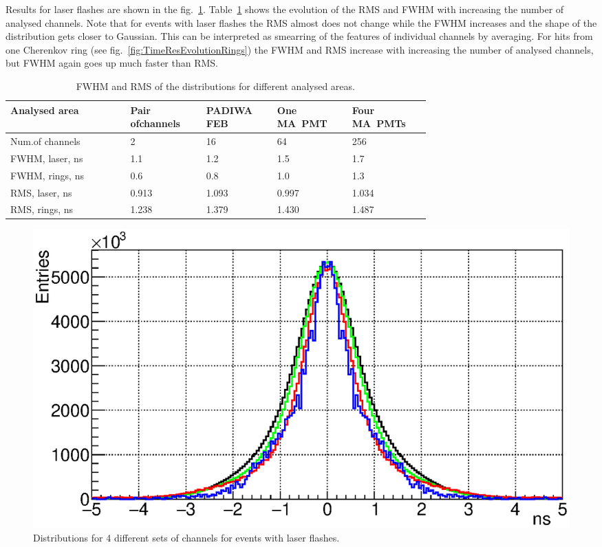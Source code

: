 \documentclass{JACoW-GSI-2015}
\begin{document}
Results for laser flashes are shown in the fig.~\ref{fig:TimeResEvolutionLaser}. Table~\ref{tabl:EvolutionParams} shows the evolution of the RMS and FWHM with increasing the number of analysed channels. Note that for events with laser flashes the RMS almost does not change while the FWHM increases and the shape of the distribution gets closer to Gaussian. This can be interpreted as smearring of the features of individual channels by averaging. For hits from one Cherenkov ring (see fig.~\ref{fig:TimeResEvolutionRings}) the FWHM and RMS increase with increasing the number of analysed channels, but FWHM again goes up much faster than RMS.

\begin{table}[tbh]
\caption{FWHM and RMS of the distributions for different analysed areas.}
\label{tabl:EvolutionParams}
\begin{tabular}{ | p{0.22\linewidth} | p{0.13\linewidth} | p{0.12\linewidth} | p{0.12\linewidth} | p{0.12\linewidth} | }
	\hline
	\scriptsize{Analysed area} & \scriptsize{Pair ofchannels} & \scriptsize{PADIWA FEB} & \scriptsize{One MA~PMT} & \scriptsize{Four MA~PMTs} \\
	\hline
	\scriptsize{Num.of channels} & 2 & 16 & 64 & 256 \\
	\hline
	\scriptsize{FWHM, laser, ns} & 1.1 & 1.2 & 1.5 & 1.7 \\
	\hline
	\scriptsize{FWHM, rings, ns} & 0.6 & 0.8 & 1.0 & 1.3 \\
	\hline
	\scriptsize{RMS, laser, ns} & 0.913 & 1.093 & 0.997 & 1.034 \\
	\hline
	\scriptsize{RMS, rings, ns} & 1.238 & 1.379 & 1.430 & 1.487 \\
	\hline
\end{tabular}
\end{table}

\begin{figure}[tbh]
\includegraphics[width=0.9\linewidth]{../PTE/pictures/24_TimePrecision_evolution_laser_feb2017.eps}
\caption{Distributions for 4 different sets of channels for events with laser flashes.}
\label{fig:TimeResEvolutionLaser}
\end{figure}
\end{document}
